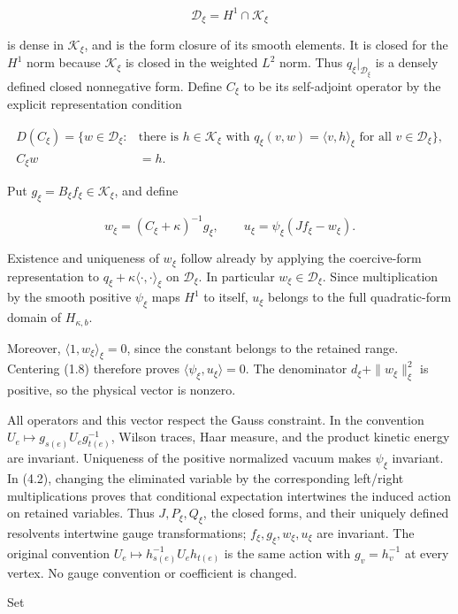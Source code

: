 \[
\mathcal D_\xi=H^1\cap\mathcal K_\xi
\]

is dense in \(\mathcal K_\xi\), and is the form closure of its smooth
elements. It is closed for the \(H^1\) norm because \(\mathcal K_\xi\)
is closed in the weighted \(L^2\) norm. Thus \(q_\xi|_{\mathcal D_\xi}\)
is a densely defined closed nonnegative form. Define \(C_\xi\) to be its
self-adjoint operator by the explicit representation condition

\[
\begin{split}
D(C_\xi)=\{w\in\mathcal D_\xi: &\text{there is }h\in\mathcal K_\xi
\text{ with }q_\xi(v,w)=\langle v,h\rangle_\xi\text{ for all }v\in\mathcal D_\xi\},\\
C_\xi w&=h.
\end{split}
\tag{7.2}
\]

Put \(g_\xi=B_\xi f_\xi\in\mathcal K_\xi\), and define

\[
w_\xi=(C_\xi+\kappa)^{-1}g_\xi,
\qquad u_\xi=\psi_\xi(Jf_\xi-w_\xi).
\tag{7.3}
\]

Existence and uniqueness of \(w_\xi\) follow already by applying the
coercive-form representation to
\(q_\xi+\kappa\langle\cdot,\cdot\rangle_\xi\) on \(\mathcal D_\xi\). In
particular \(w_\xi\in\mathcal D_\xi\). Since multiplication by the
smooth positive \(\psi_\xi\) maps \(H^1\) to itself, \(u_\xi\) belongs
to the full quadratic-form domain of \(H_{\kappa,b}\).

Moreover, \(\langle1,w_\xi\rangle_\xi=0\), since the constant belongs to
the retained range. Centering (1.8) therefore proves
\(\langle\psi_\xi,u_\xi\rangle=0\). The denominator
\(d_\xi+\|w_\xi\|_\xi^2\) is positive, so the physical vector is
nonzero.

All operators and this vector respect the Gauss constraint. In the
convention \(U_e\mapsto g_{s(e)}U_eg_{t(e)}^{-1}\), Wilson traces, Haar
measure, and the product kinetic energy are invariant. Uniqueness of the
positive normalized vacuum makes \(\psi_\xi\) invariant. In (4.2),
changing the eliminated variable by the corresponding left/right
multiplications proves that conditional expectation intertwines the
induced action on retained variables. Thus \(J,P_\xi,Q_\xi\), the closed
forms, and their uniquely defined resolvents intertwine gauge
transformations; \(f_\xi,g_\xi,w_\xi,u_\xi\) are invariant. The original
convention \(U_e\mapsto h_{s(e)}^{-1}U_eh_{t(e)}\) is the same action
with \(g_v=h_v^{-1}\) at every vertex. No gauge convention or
coefficient is changed.

Set

